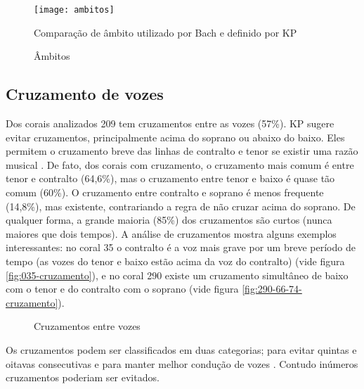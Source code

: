 \begin{figure}
  \centering
  \texttt{[image: ambitos]}
  \caption{Comparação de âmbito utilizado por Bach e definido por KP}
  \label{fig:ambito-kostka}
\end{figure}

\begin{figure}
  \centering
  \caption{Âmbitos}
  \label{fig:ambitos-alem}
\end{figure}

\subsection{Cruzamento de vozes}
\label{sec:cruzamento-de-vozes}

Dos corais analizados 209 tem cruzamentos entre as vozes (57\%). KP
sugere evitar cruzamentos, principalmente acima do soprano ou abaixo
do baixo. Eles permitem o cruzamento breve das linhas de contralto e
tenor se existir uma razão musical \cite[p. 79]{kostka.ea00:tonal}. De
fato, dos corais com cruzamento, o cruzamento mais comum é entre tenor
e contralto (64,6\%), mas o cruzamento entre tenor e baixo é quase tão
comum (60\%). O cruzamento entre contralto e soprano é menos frequente
(14,8\%), mas existente, contrariando a regra de não cruzar acima do
soprano. De qualquer forma, a grande maioria (85\%) dos cruzamentos
são curtos (nunca maiores que dois tempos). A análise de cruzamentos
mostra alguns exemplos interessantes: no coral 35 o contralto é a voz
mais grave por um breve período de tempo (as vozes do tenor e baixo
estão acima da voz do contralto) (vide figura
\ref{fig:035-cruzamento}), e no coral 290 existe um cruzamento
simultâneo de baixo com o tenor e do contralto com o soprano (vide
figura \ref{fig:290-66-74-cruzamento}).

\begin{figure}
  \centering
  \caption{Cruzamentos entre vozes}
  \label{fig:coral-003}
\end{figure}

Os cruzamentos podem ser classificados em duas categorias; para evitar
quintas e oitavas consecutivas   e para manter melhor condução de vozes
. Contudo inúmeros cruzamentos poderiam ser evitados.

